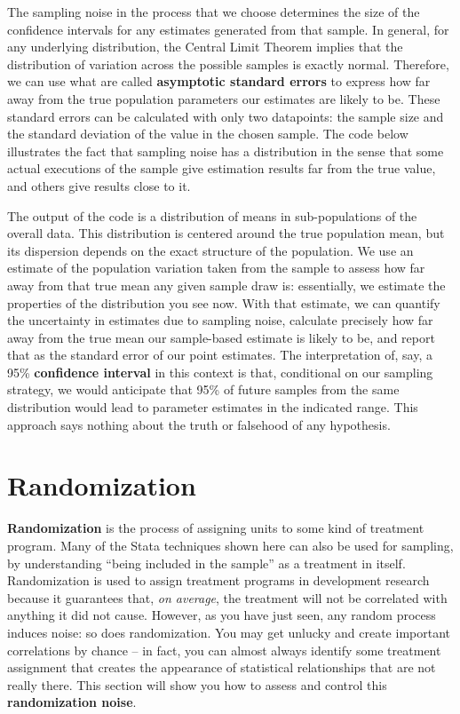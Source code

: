 The sampling noise in the process that we choose
determines the size of the confidence intervals
for any estimates generated from that sample.
In general, for any underlying distribution,
the Central Limit Theorem implies that
the distribution of variation across the possible samples is exactly normal.
Therefore, we can use what are called \textbf{asymptotic standard errors}
to express how far away from the true population parameters our estimates are likely to be.
These standard errors can be calculated with only two datapoints:
the sample size and the standard deviation of the value in the chosen sample.
The code below illustrates the fact that sampling noise
has a distribution in the sense that some actual executions of the sample
give estimation results far from the true value,
and others give results close to it.

{
}

The output of the code is a distribution of means in sub-populations of the overall data.
This distribution is centered around the true population mean,
but its dispersion depends on the exact structure of the population.
We use an estimate of the population variation taken from the sample
to assess how far away from that true mean any given sample draw is:
essentially, we estimate the properties of the distribution you see now.
With that estimate, we can quantify the uncertainty in estimates due to sampling noise,
calculate precisely how far away from the true mean
our sample-based estimate is likely to be,
and report that as the standard error of our point estimates.
The interpretation of, say, a 95\% \textbf{confidence interval}
in this context is that, conditional on our sampling strategy,
we would anticipate that 95\% of future samples from the same distribution
would lead to parameter estimates in the indicated range.
This approach says nothing about the truth or falsehood of any hypothesis.

\section{Randomization}

\textbf{Randomization} is the process of assigning units to some kind of treatment program.
Many of the Stata techniques shown here can also be used for sampling,
by understanding ``being included in the sample'' as a treatment in itself.
Randomization is used to assign treatment programs in development research
because it guarantees that, \textit{on average},
the treatment will not be correlated with anything it did not cause.\cite{duflo2007using}
However, as you have just seen,
any random process induces noise: so does randomization.
You may get unlucky and create important correlations by chance --
in fact, you can almost always identify some treatment assignment that
creates the appearance of statistical relationships that are not really there.
This section will show you how to assess and control this \textbf{randomization noise}.

